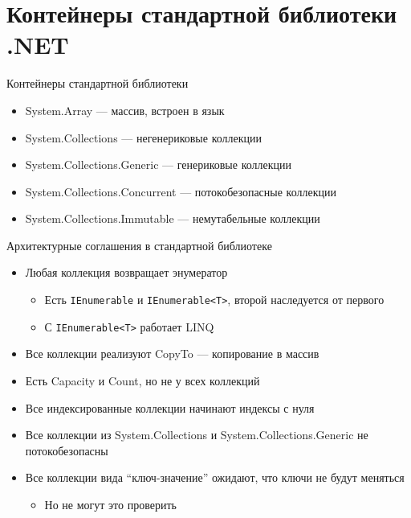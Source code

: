 \documentclass{../../slides-style}
\begin{document}
    \begin{frame}[plain]
        \titlepage
    \end{frame}

    \section{Контейнеры стандартной библиотеки .NET}


    \begin{frame}{Контейнеры стандартной библиотеки}
        \begin{itemize}
            \item System.Array --- массив, встроен в язык
            \item System.Collections --- негенериковые коллекции
            \item System.Collections.Generic --- генериковые коллекции
            \item System.Collections.Concurrent --- потокобезопасные коллекции
            \item System.Collections.Immutable --- немутабельные коллекции
        \end{itemize}
    \end{frame}

    \begin{frame}{Архитектурные соглашения в стандартной библиотеке}
        \begin{itemize}
            \item Любая коллекция возвращает энумератор
            \begin{itemize}
                \item Есть \texttt{IEnumerable} и \texttt{IEnumerable<T>}, второй наследуется от первого
                \item С \texttt{IEnumerable<T>} работает LINQ
            \end{itemize}
            \item Все коллекции реализуют CopyTo --- копирование в массив
            \item Есть Capacity и Count, но не у всех коллекций
            \item Все индексированные коллекции начинают индексы с нуля
            \item Все коллекции из System.Collections и System.Collections.Generic не потокобезопасны
            \item Все коллекции вида \enquote{ключ-значение} ожидают, что ключи не будут меняться
            \begin{itemize}
                \item Но не могут это проверить
            \end{itemize}
        \end{itemize}
    \end{frame}
\end{document}
